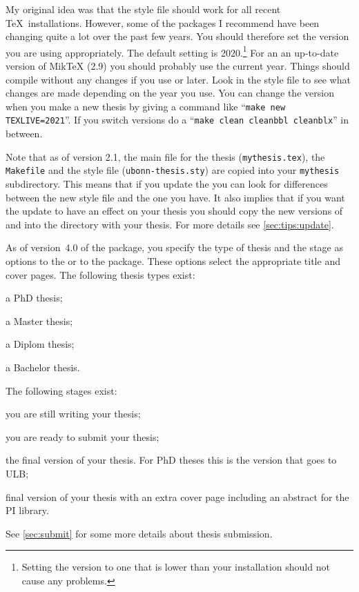 My original idea was that the style file should work for all recent
\TeX\ installations.  However, some of the packages I recommend have
been changing quite a lot over the past few years.
You should therefore set the \TeXLive version you are using appropriately.
The default setting is 2020.\footnote{%
Setting the \TeXLive version to one that is lower than your installation should not cause any problems.}
For an an up-to-date version of MikTeX (2.9) you should probably use the current year.
Things should compile without any changes if you use  or later.
Look in the style file to see what changes are made depending on the year you use.
You can change the \TeXLive version when you make a new thesis
by giving a command like \enquote{\texttt{make new TEXLIVE=2021}}. %
If you switch \TeXLive versions do a
\enquote{\texttt{make clean cleanbbl cleanblx}} in between.

Note that as of version 2.1, the main file for the thesis
(\texttt{mythesis.tex}), the \texttt{Makefile} and the style file
(\texttt{ubonn-thesis.sty}) are copied into your \texttt{mythesis}
subdirectory. This means that if you update the 
you can look for differences between the new style file and the one
you have. It also implies that if you want the update to have an
effect on your thesis you should copy the new versions of
 and  into the directory with your thesis.
For more details see \cref{sec:tips:update}.

As of version~4.0 of the package, you specify the type of thesis and the stage as options
to the  or to the  package.
These options select the appropriate title and cover pages.
The following thesis types exist:
\begin{description}\setlength{\parskip}{0pt}\setlength{\itemsep}{0pt}
\item[PhD] a PhD thesis;
\item[Master] a Master thesis;
\item[Diplom] a Diplom thesis;
\item[Bachelor] a Bachelor thesis.
\end{description}
The following stages exist:
\begin{description}\setlength{\parskip}{0pt}\setlength{\itemsep}{0pt}
\item[Draft] you are still writing your thesis;
\item[Submit] you are ready to submit your thesis;
\item[Final] the final version of your thesis.
  For PhD theses this is the version that goes to ULB\@;
\item[PILibrary] final version of your thesis with an extra cover page
  including an abstract for the PI library.
\end{description}
See \cref{sec:submit} for some more details about thesis submission.

